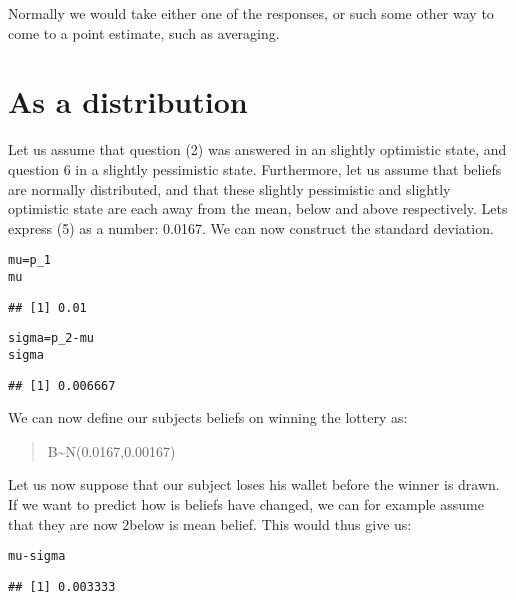 \documentclass[a4paper]{book}\usepackage{graphicx, color}
\makeatletter
\newenvironment{kframe}{%
 \def\at@end@of@kframe{}%
 \ifinner\ifhmode%
  \def\at@end@of@kframe{\end{minipage}}%
  \begin{minipage}{\columnwidth}%
 \fi\fi%
 \def\FrameCommand##1{\hskip\@totalleftmargin \hskip-\fboxsep
 \colorbox{shadecolor}{##1}\hskip-\fboxsep
     \hskip-\linewidth \hskip-\@totalleftmargin \hskip\columnwidth}%
 \MakeFramed {\advance\hsize-\width
   \@totalleftmargin\z@ \linewidth\hsize
   \@setminipage}}%
 {\par\unskip\endMakeFramed%
 \at@end@of@kframe}
\newenvironment{knitrout}{}{} %
\makeatother
\begin{document}
Normally we would take either one of the responses, or such some other
way to come to a point estimate, such as averaging.

\section{As a distribution}

Let us assume that question (2) was answered in an slightly optimistic
state, and question 6 in a slightly pessimistic state. Furthermore, let
us assume that beliefs are normally distributed, and that these slightly
pessimistic and slightly optimistic state are each away from the mean,
below and above respectively. Lets express (5) as a number: 0.0167. We
can now construct the standard deviation.

\begin{knitrout}
\color{fgcolor}\begin{kframe}
\begin{alltt}
mu = p_1
mu
\end{alltt}
\begin{verbatim}
## [1] 0.01
\end{verbatim}
\end{kframe}
\end{knitrout}


\begin{knitrout}
\color{fgcolor}\begin{kframe}
\begin{alltt}
sigma = p_2 - mu
sigma
\end{alltt}
\begin{verbatim}
## [1] 0.006667
\end{verbatim}
\end{kframe}
\end{knitrout}


We can now define our subjects beliefs on winning the lottery as:

\begin{quote}
B\textasciitilde{}N(0.0167,0.00167)
\end{quote}

Let us now suppose that our subject loses his wallet before the winner
is drawn. If we want to predict how is beliefs have changed, we can for
example assume that they are now 2below is mean belief. This would thus
give us:

\begin{knitrout}
\color{fgcolor}\begin{kframe}
\begin{alltt}
mu - sigma
\end{alltt}
\begin{verbatim}
## [1] 0.003333
\end{verbatim}
\end{kframe}
\end{knitrout}
\end{document}
